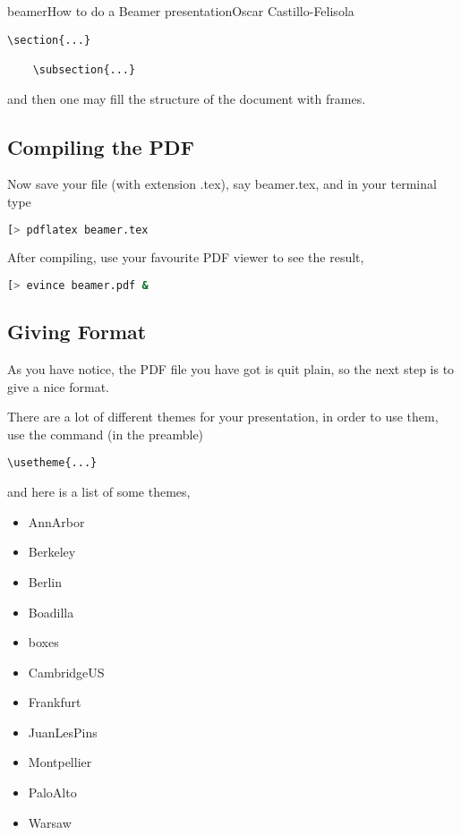 \begin{article}[2]{beamer}{How to do a Beamer presentation}{Oscar Castillo-Felisola}
\begin{lstlisting}[style=LaTeX]
    \section{...}

    \subsection{...}
  \end{lstlisting}
  and then one may fill the structure of the document with frames.

  \subsection{Compiling the PDF}

  Now save your file (with extension .tex), say  beamer.tex, and in your terminal type

  \begin{lstlisting}[language=bash,style=StyleCommand]
    [> pdflatex beamer.tex
  \end{lstlisting}

  After compiling, use your favourite PDF viewer to see the result,

  \begin{lstlisting}[language=bash,style=StyleCommand]
    [> evince beamer.pdf &
  \end{lstlisting}

  \subsection{Giving Format}

  As you have notice, the PDF file you have got is quit plain, so the next step is to give a nice format.

  There are a lot of different themes for your presentation, in order to use them, use the command (in the preamble)
  \begin{lstlisting}[style=LaTeX]
    \usetheme{...}
  \end{lstlisting}
  and here is a list of some themes,
  \begin{itemize}
  \item AnnArbor
  \item Berkeley
  \item Berlin
  \item Boadilla
  \item boxes
  \item CambridgeUS
  \item Frankfurt
  \item JuanLesPins
  \item Montpellier
  \item PaloAlto
  \item Warsaw
  \end{itemize}


\end{article}
